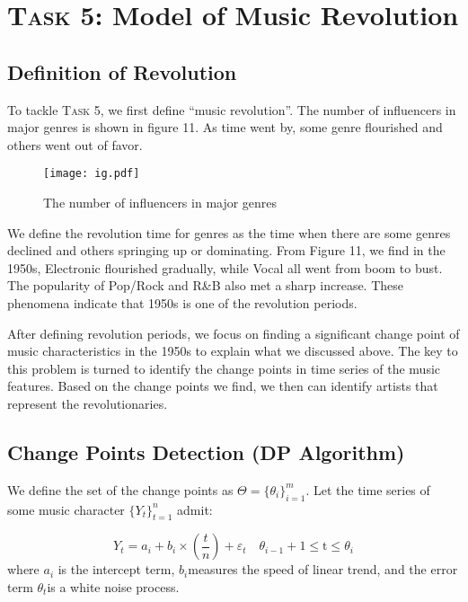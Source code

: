 \documentclass[12pt]{article}  %
\begin{document}
	\section{\textsc{Task 5}: Model of Music Revolution}
	\subsection{Definition of Revolution}
	
	To tackle \textsc{Task 5}, we first define “music revolution”. The number of influencers in major
	genres is shown in figure 11. As time went by, some genre flourished and others went out of
	favor.
	
	\begin{figure}[htbp]
		\centering
		\texttt{[image: ig.pdf]} 	%
		\caption{The number of influencers in major genres}		%
		\label{fig:ig}							%
	\end{figure}
	
	We define the revolution time for genres as the time when there are some genres declined and
	others springing up or dominating. From Figure 11, we find in the 1950s, Electronic flourished
	gradually, while Vocal all went from boom to bust. The popularity of Pop/Rock and R\&B also
	met a sharp increase. These phenomena indicate that 1950s is one of the revolution periods.
	
	After defining revolution periods, we focus on finding a significant change point of music
	characteristics in the 1950s to explain what we discussed above. The key to this problem is
	turned to identify the change points in time series of the music features. Based on the change
	points we find, we then can identify artists that represent the revolutionaries.
	
	\subsection{Change Points Detection (DP Algorithm)}
	
	We define the set of the change points as $ \Theta = {\{{\theta}_i\}}_{i=1}^m $. Let the time series of some music character $ {\{Y_t\}_{t=1}^n} $ admit:
	
	\begin{equation}
		Y_{t}=a_{i}+b_{i}\times\left(\frac{t}{n}\right)+\varepsilon_{t} \quad \theta_{i-1}+1 \leqslant \mathrm{t} \leqslant \theta_{i}
	\end{equation}
	where $ a_i $ is the intercept term, $ b_i $measures the speed of linear trend, and the error term $ \theta_{t} $is a white noise process.
	
\end{document}
